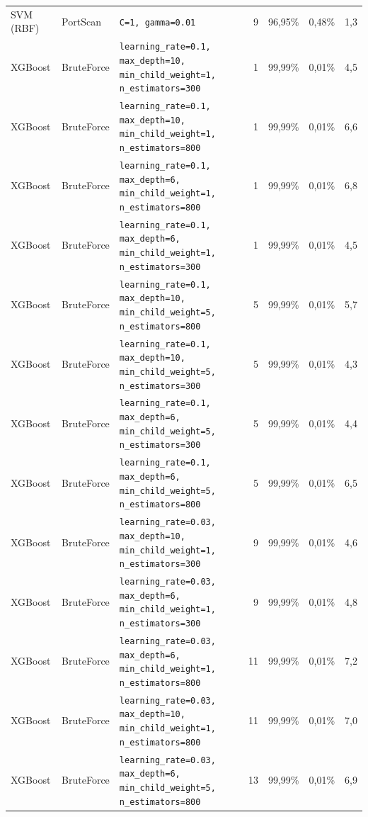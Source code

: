 {{\begin{tabularx}{\textwidth}{@{}llLrrrr@{}}
SVM (RBF) & PortScan & \scriptsize\texttt{C=1, gamma=0.01} & 9 & 96,95\% & 0,48\% & 1,3\\
XGBoost & BruteForce & \scriptsize\texttt{learning\_rate=0.1, max\_depth=10, min\_child\_weight=1, n\_estimators=300} & 1 & 99,99\% & 0,01\% & 4,5\\
XGBoost & BruteForce & \scriptsize\texttt{learning\_rate=0.1, max\_depth=10, min\_child\_weight=1, n\_estimators=800} & 1 & 99,99\% & 0,01\% & 6,6\\
XGBoost & BruteForce & \scriptsize\texttt{learning\_rate=0.1, max\_depth=6, min\_child\_weight=1, n\_estimators=800} & 1 & 99,99\% & 0,01\% & 6,8\\
XGBoost & BruteForce & \scriptsize\texttt{learning\_rate=0.1, max\_depth=6, min\_child\_weight=1, n\_estimators=300} & 1 & 99,99\% & 0,01\% & 4,5\\
XGBoost & BruteForce & \scriptsize\texttt{learning\_rate=0.1, max\_depth=10, min\_child\_weight=5, n\_estimators=800} & 5 & 99,99\% & 0,01\% & 5,7\\
XGBoost & BruteForce & \scriptsize\texttt{learning\_rate=0.1, max\_depth=10, min\_child\_weight=5, n\_estimators=300} & 5 & 99,99\% & 0,01\% & 4,3\\
XGBoost & BruteForce & \scriptsize\texttt{learning\_rate=0.1, max\_depth=6, min\_child\_weight=5, n\_estimators=300} & 5 & 99,99\% & 0,01\% & 4,4\\
XGBoost & BruteForce & \scriptsize\texttt{learning\_rate=0.1, max\_depth=6, min\_child\_weight=5, n\_estimators=800} & 5 & 99,99\% & 0,01\% & 6,5\\
XGBoost & BruteForce & \scriptsize\texttt{learning\_rate=0.03, max\_depth=10, min\_child\_weight=1, n\_estimators=300} & 9 & 99,99\% & 0,01\% & 4,6\\
XGBoost & BruteForce & \scriptsize\texttt{learning\_rate=0.03, max\_depth=6, min\_child\_weight=1, n\_estimators=300} & 9 & 99,99\% & 0,01\% & 4,8\\
XGBoost & BruteForce & \scriptsize\texttt{learning\_rate=0.03, max\_depth=6, min\_child\_weight=1, n\_estimators=800} & 11 & 99,99\% & 0,01\% & 7,2\\
XGBoost & BruteForce & \scriptsize\texttt{learning\_rate=0.03, max\_depth=10, min\_child\_weight=1, n\_estimators=800} & 11 & 99,99\% & 0,01\% & 7,0\\
XGBoost & BruteForce & \scriptsize\texttt{learning\_rate=0.03, max\_depth=6, min\_child\_weight=5, n\_estimators=800} & 13 & 99,99\% & 0,01\% & 6,9\\

\end{tabularx}}}
